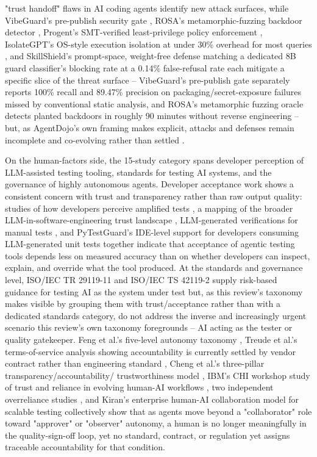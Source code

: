 "trust handoff" flaws in AI coding agents \cite{slr0532026} identify
new attack surfaces, while VibeGuard's pre-publish security gate
\cite{xie2026vibeguard}, ROSA's metamorphic-fuzzing backdoor detector
\cite{kokkonis2025rosa}, Progent's SMT-verified least-privilege policy
enforcement \cite{shi2025progent}, IsolateGPT's OS-style execution
isolation at under 30\% overhead for most queries
\cite{wu2024isolategpt}, and SkillShield's prompt-space, weight-free
defense matching a dedicated 8B guard classifier's blocking rate at a
0.14\% false-refusal rate \cite{wu2026skillshield} each mitigate a
specific slice of the threat surface -- VibeGuard's pre-publish gate
separately reports 100\% recall and 89.47\% precision on
packaging/secret-exposure failures missed by conventional static
analysis, and ROSA's metamorphic fuzzing oracle detects planted
backdoors in roughly 90 minutes without reverse engineering -- but, as
AgentDojo's own framing makes explicit, attacks and defenses remain
incomplete and co-evolving rather than settled
\cite{debenedetti2024agentdojo}.

On the human-factors side, the 15-study category spans developer
perception of LLM-assisted testing tooling, standards for testing AI
systems, and the governance of highly autonomous agents. Developer
acceptance work shows a consistent concern with trust and transparency
rather than raw output quality: studies of how developers perceive
amplified tests \cite{slr0542024,slr0552023,slr0592024}, a mapping of
the broader LLM-in-software-engineering trust landscape
\cite{slr0562025}, LLM-generated verifications for manual tests
\cite{slr0572024}, and PyTestGuard's IDE-level support for developers
consuming LLM-generated unit tests \cite{slr0582025} together indicate
that acceptance of agentic testing tools depends less on measured
accuracy than on whether developers can inspect, explain, and override
what the tool produced. At the standards and governance level,
ISO/IEC TR 29119-11 \cite{iso2020tr29119} and ISO/IEC TS 42119-2
\cite{iso2025ts42119} supply risk-based guidance for testing AI as the
system under test but, as this review's taxonomy makes visible by
grouping them with trust/acceptance rather than with a dedicated
standards category, do not address the inverse and increasingly urgent
scenario this review's own taxonomy foregrounds -- AI acting as the
tester or quality gatekeeper. Feng et al.'s five-level autonomy
taxonomy \cite{feng2025autonomylevels}, Treude et al.'s terms-of-service
analysis showing accountability is currently settled by vendor
contract rather than engineering standard \cite{treude2026accountable},
Cheng et al.'s three-pillar transparency/accountability/
trustworthiness model \cite{cheng2026threepillar}, IBM's CHI workshop
study of trust and reliance in evolving human-AI workflows
\cite{ibm2024trew}, two independent overreliance studies
\cite{passi2025overreliance,ibrahim2025overreliance}, and Kiran's
enterprise human-AI collaboration model for scalable testing
\cite{kiran2026humanai} collectively show that as agents move beyond a
"collaborator" role toward "approver" or "observer" autonomy, a human
is no longer meaningfully in the quality-sign-off loop, yet no
standard, contract, or regulation yet assigns traceable accountability
for that condition.


